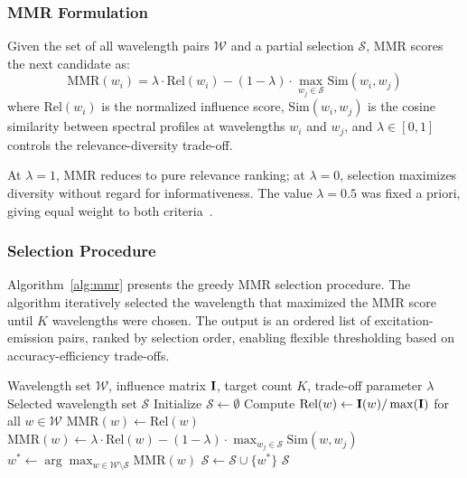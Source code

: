 \subsubsection{MMR Formulation}
Given the set of all wavelength pairs $\mathcal{W}$ and a partial selection $\mathcal{S}$, MMR scores the next candidate as:
\begin{equation}
\text{MMR}(w_i) = \lambda \cdot \text{Rel}(w_i) - (1 - \lambda) \cdot \max_{w_j \in \mathcal{S}} \text{Sim}(w_i, w_j)
\label{eq:mmr}
\end{equation}
where $\text{Rel}(w_i)$ is the normalized influence score, $\text{Sim}(w_i, w_j)$ is the cosine similarity between spectral profiles at wavelengths $w_i$ and $w_j$, and $\lambda \in [0, 1]$ controls the relevance-diversity trade-off.

At $\lambda = 1$, MMR reduces to pure relevance ranking; at $\lambda = 0$, selection maximizes diversity without regard for informativeness.
The value $\lambda = 0.5$ was fixed a priori, giving equal weight to both criteria~\cite{carbonell1998use}.

\subsubsection{Selection Procedure}
Algorithm~\ref{alg:mmr} presents the greedy MMR selection procedure.
The algorithm iteratively selected the wavelength that maximized the MMR score until $K$ wavelengths were chosen.
The output is an ordered list of excitation-emission pairs, ranked by selection order, enabling flexible thresholding based on accuracy-efficiency trade-offs.

\begin{algorithm}[t]
\caption{MMR Wavelength Selection}
\label{alg:mmr}
\begin{algorithmic}[1]
\REQUIRE Wavelength set $\mathcal{W}$, influence matrix $\mathbf{I}$, target count $K$, trade-off parameter $\lambda$
\ENSURE Selected wavelength set $\mathcal{S}$
\STATE Initialize $\mathcal{S} \gets \emptyset$
\STATE Compute $\text{Rel}(w) \gets \mathbf{I}(w) / \max(\mathbf{I})$ for all $w \in \mathcal{W}$
            \STATE $\text{MMR}(w) \gets \text{Rel}(w)$
        \ELSE
            \STATE $\text{MMR}(w) \gets \lambda \cdot \text{Rel}(w) - (1-\lambda) \cdot \max_{w_j \in \mathcal{S}} \text{Sim}(w, w_j)$
        \ENDIF
    \ENDFOR
    \STATE $w^* \gets \arg\max_{w \in \mathcal{W} \setminus \mathcal{S}} \text{MMR}(w)$
    \STATE $\mathcal{S} \gets \mathcal{S} \cup \{w^*\}$
\ENDFOR
\RETURN $\mathcal{S}$
\end{algorithmic}
\end{algorithm}

